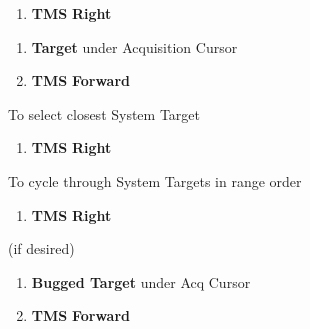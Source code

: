\begin{checklistenumerate}
\begin{enumerate}
        \item \textbf{TMS} \dotfill \textbf{Right}
    \end{enumerate}
    \label{subsec:sensorsaa:apg68:tws:multi:bug}
    \begin{enumerate}
        \item \textbf{Target} \dotfill under Acquisition Cursor
        \item \textbf{TMS} \dotfill \textbf{Forward}
    \end{enumerate}
    To select closest System Target 
    \begin{enumerate}
        \item \textbf{TMS} \dotfill \textbf{Right}
    \end{enumerate}
    To cycle through System Targets in range order
    \begin{enumerate}
        \item \textbf{TMS} \dotfill \textbf{Right}
    \end{enumerate}
     (if desired)
    \begin{enumerate}
        \item \textbf{Bugged Target} \dotfill under Acq Cursor
        \item \textbf{TMS} \dotfill \textbf{Forward}
    \end{enumerate}
\end{checklistenumerate}

\marginfigrestore